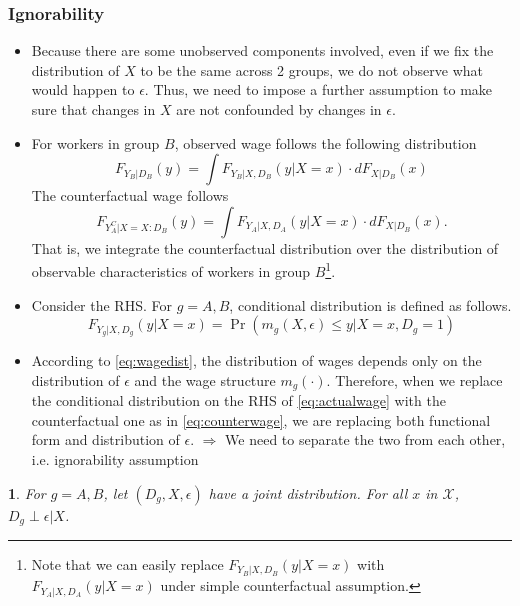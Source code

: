 \documentclass[a4paper, 12pt]{article}
\makeatletter
\newtheorem*{assumption*}{\assumptionnumber}
\providecommand{\assumptionnumber}{}
\newenvironment{assumption}[2]
 {%
  \renewcommand{\assumptionnumber}{Assumption #1 \textit{(#2)}}%
  \begin{assumption*}%
  \protected@edef\@currentlabel{#1}%
 }
 {%
  \end{assumption*}
 }
\makeatother
\begin{document}
\subsubsection{Ignorability}
\begin{itemize}
\item Because there are some unobserved components involved, even if we fix the distribution of $X$ to be the same across 2 groups, we do not observe what would happen to $\epsilon$. Thus, we need to impose a further assumption to make sure that changes in $X$ are not confounded by changes in $\epsilon$.
\item For workers in group $B$, observed wage follows the following distribution
\begin{equation}
F_{Y_B|D_B}(y) = \int F_{Y_B|X,D_B}(y|X=x) \cdot dF_{X|D_B}(x)
\label{eq:actualwage}
\end{equation}
The counterfactual wage follows
\begin{equation}
F_{Y^C_A|X=X:D_B}(y) = \int F_{Y_A|X,D_A}(y|X=x) \cdot dF_{X|D_B}(x).
\label{eq:counterwage}
\end{equation}
That is, we integrate the counterfactual distribution over the distribution of observable characteristics of workers in group $B$\footnote{Note that we can easily replace $F_{Y_B|X,D_B}(y|X=x)$ with $F_{Y_A|X,D_A}(y|X=x)$ under simple counterfactual assumption.}.

\item Consider the RHS. For $g=A, B$, conditional distribution is defined as follows.
\begin{equation}
F_{Y_g|X,D_g}(y|X=x) = 
\Pr
(
m_g(X,\epsilon)
\leq
y
|
X=x, D_g=1
)
\label{eq:wagedist}
\end{equation}

\item According to \eqref{eq:wagedist}, the distribution of wages depends only on the distribution of $\epsilon$ and the wage structure $m_g(\cdot)$. Therefore, when we replace the conditional distribution on the RHS of \eqref{eq:actualwage} with the counterfactual one as in \eqref{eq:counterwage}, we are replacing both functional form and distribution of $\epsilon$. $\Rightarrow$ We need to separate the two from each other, i.e. ignorability assumption

\end{itemize}

\begin{assumption}{5}{Ignorability/Conditional independence}
For $g=A, B$, let $(D_g, X, \epsilon)$ have a joint distribution. For all $x$ in $\mathcal{X}$, $D_g \perp \epsilon|X$. 
\end{assumption}
\end{document}
